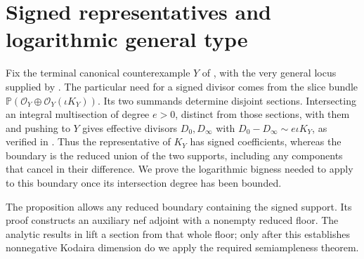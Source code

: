 \section{Signed representatives and logarithmic general type}
\label{sec:signed-representatives}

Fix the terminal canonical counterexample $Y$ of
, with the very general locus supplied by
. The particular need for a signed divisor
comes from the slice bundle
$\mathbb P(\mathcal O_Y\oplus\mathcal O_Y(\iota K_Y))$.
Its two summands determine disjoint sections. Intersecting an integral
multisection of degree $e>0$, distinct from those sections, with them
and pushing to $Y$ gives effective divisors $D_0,D_\infty$ with
$D_0-D_\infty\sim e\iota K_Y$, as verified in
. Thus the representative of $K_Y$
has signed coefficients, whereas the boundary is the reduced union
of the two supports, including any components that cancel in their
difference. We prove the logarithmic bigness needed to apply
 to this boundary once its intersection
degree has been bounded.

The proposition allows any reduced boundary containing the signed
support. Its proof constructs an auxiliary nef adjoint with a
nonempty reduced floor. The analytic results in
 lift a section from that whole floor;
only after this establishes nonnegative Kodaira dimension do we
apply the required semiampleness theorem.


